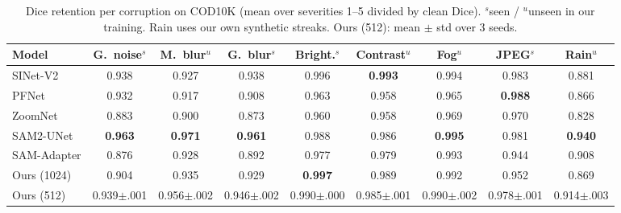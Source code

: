 \begin{table}[t]
\centering
\caption{Dice retention per corruption on COD10K (mean over severities 1--5 divided by clean Dice). $^s$seen / $^u$unseen in our training. Rain uses our own synthetic streaks. Ours (512): mean $\pm$ std over 3 seeds.}
\label{tab:percorruption}
\footnotesize
\begin{tabular}{lcccccccc}
\toprule
Model & G.~noise$^{s}$ & M.~blur$^{u}$ & G.~blur$^{s}$ & Bright.$^{s}$ & Contrast$^{u}$ & Fog$^{u}$ & JPEG$^{s}$ & Rain$^{u}$ \\
\midrule
SINet-V2 & 0.938 & 0.927 & 0.938 & 0.996 & \textbf{0.993} & 0.994 & 0.983 & 0.881 \\
PFNet & 0.932 & 0.917 & 0.908 & 0.963 & 0.958 & 0.965 & \textbf{0.988} & 0.866 \\
ZoomNet & 0.883 & 0.900 & 0.873 & 0.960 & 0.958 & 0.969 & 0.970 & 0.828 \\
SAM2-UNet & \textbf{0.963} & \textbf{0.971} & \textbf{0.961} & 0.988 & 0.986 & \textbf{0.995} & 0.981 & \textbf{0.940} \\
SAM-Adapter & 0.876 & 0.928 & 0.892 & 0.977 & 0.979 & 0.993 & 0.944 & 0.908 \\
Ours (1024) & 0.904 & 0.935 & 0.929 & \textbf{0.997} & 0.989 & 0.992 & 0.952 & 0.869 \\
Ours (512) & 0.939{\tiny$\pm$.001} & 0.956{\tiny$\pm$.002} & 0.946{\tiny$\pm$.002} & 0.990{\tiny$\pm$.000} & 0.985{\tiny$\pm$.001} & 0.990{\tiny$\pm$.002} & 0.978{\tiny$\pm$.001} & 0.914{\tiny$\pm$.003} \\
\bottomrule
\end{tabular}
\end{table}
